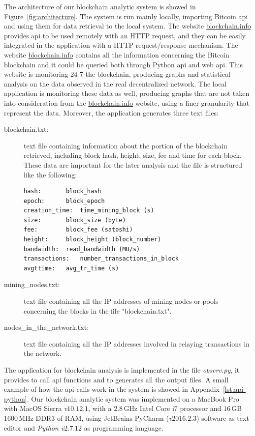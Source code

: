 \documentclass[USenglish]{uit-thesis}
\begin{document}
The architecture of our blockchain analytic system is showed in Figure~\ref{fig:architecture}. The system 
is run mainly locally, importing Bitcoin \gls{api} and using them for data retrieval to the
local system. The website \url{blockchain.info} provides \gls{api} to be used remotely with an
HTTP request, and they can be easily integrated in the application with a HTTP
request/response mechanism. The website \url{blockchain.info} contains all the information
concerning the Bitcoin blockchain and it could be queried both through Python \gls{api}
and web \gls{api}. This website is monitoring 24-7 the blockchain, producing graphs and
statistical analysis on the data observed in the real decentralized network. The local
application is monitoring these data as well, producing graphs that are not taken into
consideration from the \url{blockchain.info} website, using a finer granularity that represent
the data. Moreover, the application generates three text files:
\begin{description}
	\item [blockchain.txt:] text file containing information about the portion
	of the blockchain retrieved, including block hash, height, size, fee and
	time for each block. These data are important for the later analysis and the file is structured like the following:
	\begin{lstlisting}
hash:		block_hash
epoch:		block_epoch
creation_time: 	time_mining_block (s)
size: 		block_size (byte)
fee: 		block_fee (satoshi)
height: 	block_height (block_number)
bandwidth: 	read_bandwidth (MB/s)
transactions: 	number_transactions_in_block
avgttime: 	avg_tr_time (s)
	\end{lstlisting}
	\item [mining\_nodes.txt:] text file containing all the IP addresses of mining nodes or pools
	concerning the blocks in the file "blockchain.txt".
	\item [nodes\_in\_the\_network.txt:] text file containing all the IP addresses involved in relaying transactions
	in the network.
\end{description}

The application for blockchain analysis is implemented in the file  \emph{observ.py}, it provides
to call \gls{api} functions and to generates all the output files. A small
example of how the \gls{api} calls work in the system is showed in Appendix~\ref{lst:api-python}.
Our blockchain analytic system was implemented on a MacBook Pro with MacOS Sierra \emph{v$10.12.1$},
with a $2.8$\,GHz Intel Core i$7$ processor and $16$\,GB~$1600$\,MHz DDR3 of RAM, using
JetBrains PyCharm (\emph{v$2016.2.3$}) software as text editor and \emph{Python v$2.7.12$}
as programming language.
\end{document}
